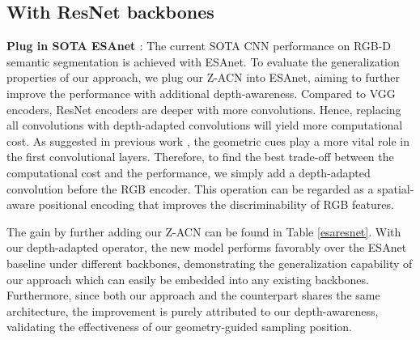 \documentclass[lettersize,journal]{IEEEtran}
\begin{document}
\subsection{With ResNet backbones} 
\textbf{Plug in SOTA ESAnet \cite{esanet2021icra}}: The current SOTA CNN performance on RGB-D semantic segmentation is achieved with ESAnet. To evaluate the generalization properties of our approach, we plug our Z-ACN into ESAnet, aiming to further improve the performance with additional depth-awareness. Compared to VGG encoders, ResNet encoders are deeper with more convolutions. Hence, replacing all convolutions with depth-adapted convolutions will yield more computational cost. As suggested in previous work \cite{omniflow,shi2022panoflow}, the geometric cues play a more vital role in the first convolutional layers. Therefore, to find the best trade-off between the computational cost and the performance, we simply add a  depth-adapted convolution before the RGB encoder. This operation can be regarded as a spatial-aware positional encoding that improves the discriminability of RGB features. 

The gain by further adding our Z-ACN can be found in Table \ref{esaresnet}. With our depth-adapted operator, the new model performs favorably over the ESAnet baseline under different backbones, demonstrating the generalization capability of our approach which can easily be embedded into any existing backbones. Furthermore, since both our approach and the counterpart shares the same architecture, the improvement is purely attributed to our depth-awareness, validating the effectiveness of our geometry-guided sampling position.
\end{document}

